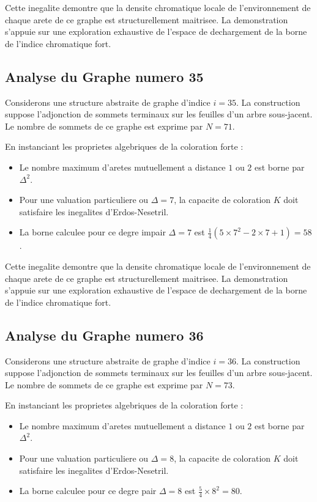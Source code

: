 \documentclass[11pt,a4paper]{article}
\begin{document}
Cette inegalite demontre que la densite chromatique locale de l'environnement de chaque arete de ce graphe est structurellement maitrisee. La demonstration s'appuie sur une exploration exhaustive de l'espace de dechargement de la borne de l'indice chromatique fort.

\subsection{Analyse du Graphe numero 35}
Considerons une structure abstraite de graphe d'indice $i = 35$. La construction suppose l'adjonction de sommets terminaux sur les feuilles d'un arbre sous-jacent. Le nombre de sommets de ce graphe est exprime par $N = 71$.

En instanciant les proprietes algebriques de la coloration forte :
\begin{itemize}
\item Le nombre maximum d'aretes mutuellement a distance $1$ ou $2$ est borne par $\Delta^2$.
\item Pour une valuation particuliere ou $\Delta = 7$, la capacite de coloration $K$ doit satisfaire les inegalites d'Erdos-Nesetril.
\item La borne calculee pour ce degre impair $\Delta = 7$ est $\frac{1}{4}(5 \times 7^2 - 2 \times 7 + 1) = 58$.
\end{itemize}

Cette inegalite demontre que la densite chromatique locale de l'environnement de chaque arete de ce graphe est structurellement maitrisee. La demonstration s'appuie sur une exploration exhaustive de l'espace de dechargement de la borne de l'indice chromatique fort.

\subsection{Analyse du Graphe numero 36}
Considerons une structure abstraite de graphe d'indice $i = 36$. La construction suppose l'adjonction de sommets terminaux sur les feuilles d'un arbre sous-jacent. Le nombre de sommets de ce graphe est exprime par $N = 73$.

En instanciant les proprietes algebriques de la coloration forte :
\begin{itemize}
\item Le nombre maximum d'aretes mutuellement a distance $1$ ou $2$ est borne par $\Delta^2$.
\item Pour une valuation particuliere ou $\Delta = 8$, la capacite de coloration $K$ doit satisfaire les inegalites d'Erdos-Nesetril.
\item La borne calculee pour ce degre pair $\Delta = 8$ est $\frac{5}{4} \times 8^2 = 80$.
\end{itemize}
\end{document}
